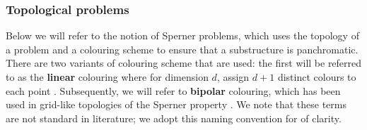 \begin{table}[h!]
    \centering
     \quad

    \caption{Three-valued logic \cite{kleene_IntroductionMetamathematics_2009}}\label{tab:three-val-logic}
\end{table}

%

%

\subsubsection{Topological problems}

Below we will refer to the notion of Sperner problems, which uses
the topology of a problem and a colouring scheme to ensure
that a substructure is panchromatic. There are two variants of colouring scheme
that are used: the first will be referred to as the \textbf{linear} colouring
where for dimension $d$, assign $d+1$ distinct colours to each point \cite{daskalakis_ComplexityComputingNash_2006, chen_Complexity2DDiscrete_2009}.
Subsequently, we will refer to \textbf{bipolar} colouring, which has been used in grid-like topologies of the Sperner property
\cite{chen_SettlingComplexityComputing_2009, deligkas_PureCircuitTightInapproximability_2024, daskalakis_ComplexityConstrainedMinmax_2021}.
We note that these terms are not standard in literature; we adopt this naming convention
for of clarity.



